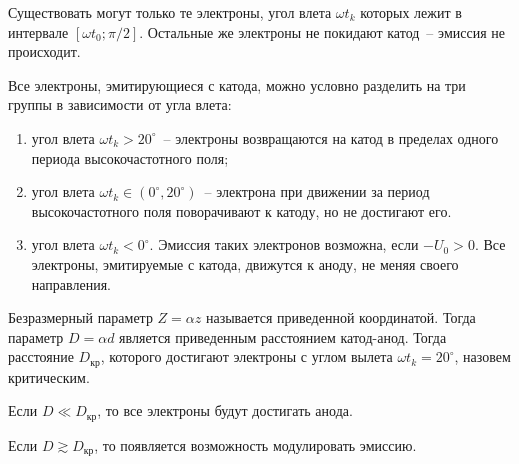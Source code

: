 Существовать могут только те электроны, угол влета \( \omega t_k \) которых
лежит в интервале \( [\omega t_0; \pi / 2] \). Остальные же электроны не
покидают катод~-- эмиссия не происходит.

Все электроны, эмитирующиеся с катода, можно условно разделить на три группы в
зависимости от угла влета:
\begin{enumerate}
  \item угол влета \( \omega t_k > 20^\circ \)~-- электроны возвращаются на
    катод в пределах одного периода высокочастотного поля;
  \item угол влета \( \omega t_k \in (0^\circ, 20^\circ) \)~-- электрона при
    движении за период высокочастотного поля поворачивают к катоду, но не
    достигают его.
  \item угол влета \( \omega t_k < 0^\circ \). Эмиссия таких электронов
    возможна, если \( -U_0 > 0 \). Все электроны, эмитируемые с катода,
    движутся к аноду, не меняя своего направления.
\end{enumerate}

Безразмерный параметр \( Z = \alpha z \) называется приведенной координатой.
Тогда параметр \( D = \alpha d \) является приведенным расстоянием катод-анод.
Тогда расстояние \( D_\text{кр} \), которого достигают электроны с углом вылета
\( \omega t_k = 20^\circ \), назовем критическим.

Если \( D \ll D_\text{кр} \), то все электроны будут достигать анода.

Если \( D \gtrsim D_\text{кр} \), то появляется возможность модулировать
эмиссию.
